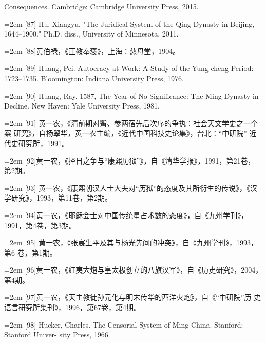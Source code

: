 \space%
Consequences. Cambridge: Cambridge University Press, 2015.%
\par
\noindent\hangindent=2em
[87] Hu, Xiangyu. "The Juridical System of the Qing Dynasty in Beijing, 1644–1900."%
Ph.D. diss., University of Minnesota, 2011.%
\par
\noindent\hangindent=2em
[88]黄伯禄，《正教奉褒》，上海：慈母堂，1904。%
\par
\noindent\hangindent=2em
[89] Huang, Pei. Autocracy at Work: A Study of the Yung-cheng Period: 1723–1735.%
\space%
Bloomington: Indiana University Press, 1976.%
\par
\noindent\hangindent=2em
[90] Huang, Ray. 1587, The Year of No Significance: The Ming Dynasty in Decline. New%
\space%
Haven: Yale University Press, 1981.%
\par
\noindent\hangindent=2em
[91] 黄一农，《清前期对觜、参两宿先后次序的争执：社会天文学史之一个案%
研究》，自杨翠华，黄一农主编，《近代中国科技史论集》，台北：“中研院”%
近代史研究所，1991。%
\par
\noindent\hangindent=2em
[92]黄一农，《择日之争与“康熙历狱”》，自《清华学报》，1991，第21卷，%
第2期。%
\par
\noindent\hangindent=2em
[93] 黄一农，《康熙朝汉人士大夫对“历狱”的态度及其所衍生的传说》，《汉%
学研究》，1993，第11卷，第2期。%
\par
\noindent\hangindent=2em
[94]黄一农，《耶稣会士对中国传统星占术数的态度》，自《九州学刊》，%
1991，第4卷，第3期。%
\par
\noindent\hangindent=2em
[95] 黄一农，《张宸生平及其与杨光先间的冲突》，自《九州学刊》，1993，第6%
卷，第1期。%
\par
\noindent\hangindent=2em
[96]黄一农，《红夷大炮与皇太极创立的八旗汉军》，自《历史研究》，2004，%
第4期。%
\par
\noindent\hangindent=2em
[97]黄一农，《天主教徒孙元化与明末传华的西洋火炮》，自《“中研院”历%
史语言研究所集刊》，1996，第67卷，第4期。%
\par
\noindent\hangindent=2em
[98] Hucker, Charles. The Censorial System of Ming China. Stanford: Stanford Univer-%
sity Press, 1966.%
\par
